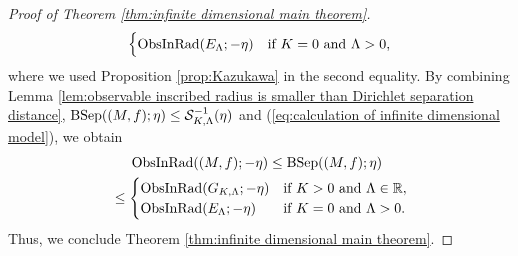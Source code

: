 \begin{proof}[Proof of Theorem \ref{thm:infinite dimensional main theorem}]
\begin{align}
\begin{cases}
                                                           \operatorname{ObsInRad}(E_{\Lambda};-\eta)     & \text{if $K=0$ and $\Lambda>0$},
                                                           \end{cases}
\end{align}
where we used Proposition \ref{prop:Kazukawa} in the second equality.
By combining Lemma \ref{lem:observable inscribed radius is smaller than Dirichlet separation distance}, $\operatorname{BSep}((M,f);\eta)\leq \mathcal{S}^{-1}_{K,\Lambda}(\eta)$ and (\ref{eq:calculation of infinite dimensional model}),
we obtain 
\begin{align*}
&\quad \,\,\operatorname{ObsInRad}((M,f);-\eta)\leq \operatorname{BSep}((M,f);\eta)\\
                                        &\leq \begin{cases}
                                                   \operatorname{ObsInRad}(G_{K,\Lambda};-\eta) & \text{if $K>0$ and $\Lambda \in \mathbb{R}$}, \\
                                                   \operatorname{ObsInRad}(E_{\Lambda};-\eta)     & \text{if $K=0$ and $\Lambda>0$}.
                                                  \end{cases}
\end{align*}
Thus,
we conclude Theorem \ref{thm:infinite dimensional main theorem}.
\end{proof}

